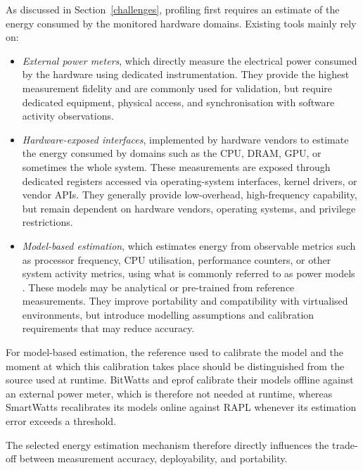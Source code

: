 \documentclass[
  acmsmall,
  screen,
  review,
  xcolor={dvipsnames,usenames}
]{acmart}
\begin{document}
As discussed in Section~\ref{challenges}, profiling first requires an estimate of the energy consumed by the monitored hardware domains. Existing tools mainly rely on:

\begin{itemize}
    \item \emph{External power meters}, which directly measure the electrical power consumed by the hardware using dedicated instrumentation. They provide the highest measurement fidelity and are commonly used for validation, but require dedicated equipment, physical access, and synchronisation with software activity observations.

    \item \emph{Hardware-exposed interfaces}, implemented by hardware vendors to estimate the energy consumed by domains such as the CPU, DRAM, GPU, or sometimes the whole system. These measurements are exposed through dedicated registers accessed via operating-system interfaces, kernel drivers, or vendor APIs. They generally provide low-overhead, high-frequency capability, but remain dependent on hardware vendors, operating systems, and privilege restrictions.

    \item \emph{Model-based estimation}, which estimates energy from observable metrics such as processor frequency, CPU utilisation, performance counters, or other system activity metrics, using what is commonly referred to as power models \cite{colmantProcesslevelPowerEstimation2015,fieniSmartWattsSelfCalibratingSoftwareDefined2020}. These models may be analytical or pre-trained from reference measurements. They improve portability and compatibility with virtualised environments, but introduce modelling assumptions and calibration requirements that may reduce accuracy.
\end{itemize}

For model-based estimation, the reference used to calibrate the model and the moment at which this calibration takes place should be distinguished from the source used at runtime. BitWatts \cite{colmantProcesslevelPowerEstimation2015} and eprof \cite{schubertProfilingSoftwareEnergy2012} calibrate their models offline against an external power meter, which is therefore not needed at runtime, whereas SmartWatts \cite{fieniSmartWattsSelfCalibratingSoftwareDefined2020} recalibrates its models online against RAPL whenever its estimation error exceeds a threshold.

The selected energy estimation mechanism therefore directly influences the trade-off between measurement accuracy, deployability, and portability.
\end{document}
